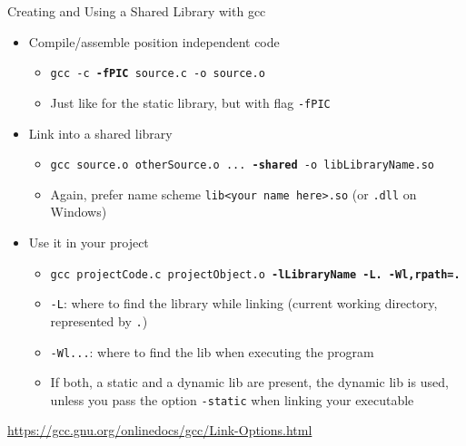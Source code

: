 \begin{frame}{Creating and Using a Shared Library with gcc}
%
\begin{itemize}
\item Compile/assemble position independent code
	\begin{itemize}
	\item \texttt{gcc -c \textbf{-fPIC} source.c -o source.o}
	\item Just like for the static library, but with flag \texttt{-fPIC}
	\end{itemize}
\item Link into a shared library
	\begin{itemize}
	\item \texttt{gcc source.o otherSource.o ... \textbf{-shared} -o libLibraryName.so}
	\item Again, prefer name scheme \texttt{lib<your name here>.so} (or \texttt{.dll} on Windows)
	\end{itemize}
\item Use it in your project
	\begin{itemize}
	\item \texttt{gcc projectCode.c projectObject.o \textbf{-lLibraryName -L. -Wl,rpath=.}}
	\item \texttt{-L}: where to find the library while linking (current working directory, represented by \texttt{.})
	\item \texttt{-Wl...}: where to find the lib when executing the program
	\item If both, a static and a dynamic lib are present, the dynamic lib is used, unless you pass the option \texttt{-static} when linking your executable
	\end{itemize}
\end{itemize}
%
\begin{hintbox}
\footnotesize
\url{https://gcc.gnu.org/onlinedocs/gcc/Link-Options.html}
\end{hintbox}
%
\end{frame}


